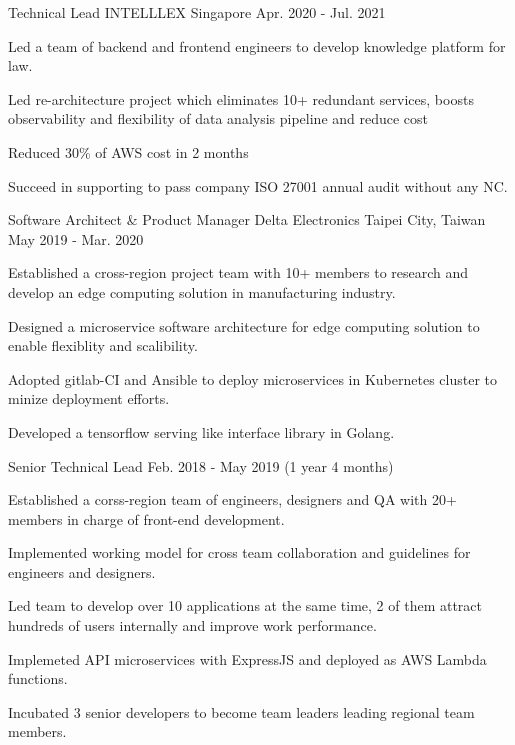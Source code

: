 \begin{cventries}
  \cventry
    {Technical Lead} %
    {INTELLLEX} %
    {Singapore} %
    {Apr. 2020 - Jul. 2021} %
    {
      \begin{cvitems} %
        \item {Led a team of backend and frontend engineers to develop knowledge platform for law.}
        \item {Led re-architecture project which eliminates 10+ redundant services, boosts observability
and flexibility of data analysis pipeline and reduce cost}
        \item {Reduced 30\% of AWS cost in 2 months}
        \item {Succeed in supporting to pass company ISO 27001 annual audit without any NC.}
      \end{cvitems}
    }

  \cventry
    {Software Architect \& Product Manager} %
    {Delta Electronics} %
    {Taipei City, Taiwan} %
    {May 2019 - Mar. 2020} %
    {
      \begin{cvitems} %
        \item {Established a cross-region project team with 10+ members to research and develop an edge computing solution in manufacturing industry.}
        \item {Designed a microservice software architecture for edge computing solution to enable flexiblity and scalibility.}
        \item {Adopted gitlab-CI and Ansible to deploy microservices in Kubernetes cluster to minize deployment efforts.}
        \item {Developed a tensorflow serving like interface library in Golang.}
      \end{cvitems}
    }

  \cventry
    {Senior Technical Lead} %
    {} %
    {} %
    {Feb. 2018 - May 2019 (1 year 4 months)} %
    {
      \begin{cvitems} %
        \item {Established a corss-region team of engineers, designers and QA with 20+ members in charge of front-end development.}
        \item {Implemented working model for cross team collaboration and guidelines for engineers and designers.}
        \item {Led team to develop over 10 applications at the same time, 2 of them attract hundreds of users internally and improve work performance.}
        \item {Implemeted API microservices with ExpressJS and deployed as AWS Lambda functions.}
        \item {Incubated 3 senior developers to become team leaders leading regional team members.}
      \end{cvitems}
    }


\end{cventries}
